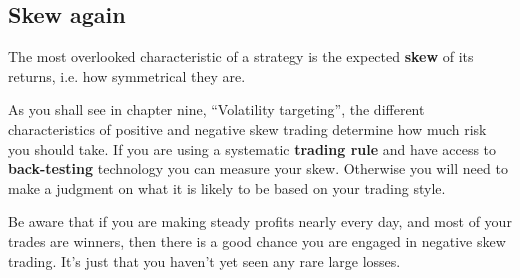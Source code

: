 \subsection*{Skew again}

The most overlooked characteristic of a strategy is the expected \textbf{skew} of its returns, i.e. how symmetrical they are.

As you shall see in chapter nine, ``Volatility targeting'', the different characteristics of positive and negative skew trading determine how much risk you should take. If you are using a systematic \textbf{trading rule} and have access to \textbf{back-testing} technology you can measure your skew. Otherwise you will need to make a judgment on what it is likely to be based on your trading style.

Be aware that if you are making steady profits nearly every day, and most of your trades are winners, then there is a good chance you are engaged in negative skew trading. It's just that you haven't yet seen any rare large losses.

